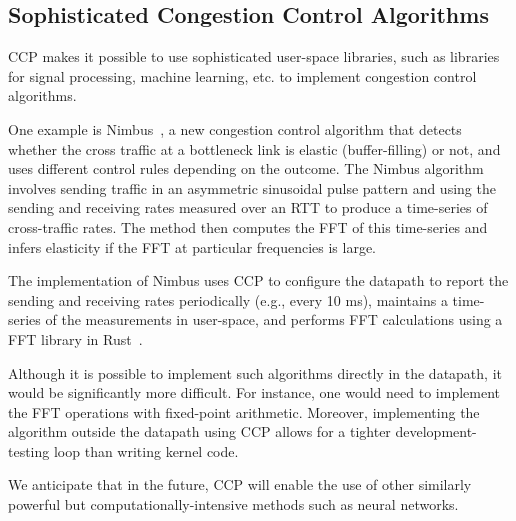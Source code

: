 \subsection{Sophisticated Congestion Control Algorithms}
\label{s:capabilities:algs}

CCP makes it possible to use sophisticated user-space libraries, such as libraries for signal processing, machine learning, etc. to implement congestion control algorithms.

One example is Nimbus~\cite{nimbus}, a new congestion control algorithm that detects whether the cross traffic at a bottleneck link is  elastic (buffer-filling) or not, and uses different control rules depending on the outcome. The Nimbus algorithm involves sending traffic in an asymmetric sinusoidal pulse pattern and using the sending and receiving rates measured over an RTT to produce a time-series of cross-traffic rates. The method then computes the FFT of this time-series and infers elasticity if the FFT at particular frequencies is large.

The implementation of Nimbus uses CCP to configure the datapath to report the sending and receiving rates periodically (e.g., every 10 ms), maintains a time-series of the measurements in user-space, and performs FFT calculations using a FFT library in Rust~\cite{rustfft}. 

Although it is possible to implement such algorithms directly in the datapath, it would be significantly more difficult. For instance, one would need to implement the FFT operations with fixed-point arithmetic. Moreover, implementing the algorithm outside the datapath using CCP allows for a tighter development-testing loop than writing kernel code.


We anticipate that in the future, CCP will enable the use of other similarly powerful but computationally-intensive methods such as neural networks.



